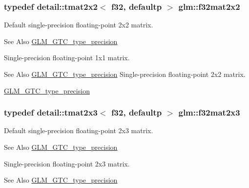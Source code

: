 \hypertarget{group__gtc__type__precision_ga4eb16d89ecff72fa77f10c9a1e7ca475}{
\subsubsection[{f32mat2x2}]{\setlength{\rightskip}{0pt plus 5cm}typedef detail\-::tmat2x2$<$ f32, defaultp $>$ {\bf glm\-::f32mat2x2}}}\label{group__gtc__type__precision_ga4eb16d89ecff72fa77f10c9a1e7ca475}
Default single-\/precision floating-\/point 2x2 matrix. \begin{DoxySeeAlso}{See Also}
\hyperlink{group__gtc__type__precision}{G\-L\-M\-\_\-\-G\-T\-C\-\_\-type\-\_\-precision}
\end{DoxySeeAlso}
Single-\/precision floating-\/point 1x1 matrix. \begin{DoxySeeAlso}{See Also}
\hyperlink{group__gtc__type__precision}{G\-L\-M\-\_\-\-G\-T\-C\-\_\-type\-\_\-precision} Single-\/precision floating-\/point 2x2 matrix. 

\hyperlink{group__gtc__type__precision}{G\-L\-M\-\_\-\-G\-T\-C\-\_\-type\-\_\-precision} 
\end{DoxySeeAlso}
\hypertarget{group__gtc__type__precision_ga5ad96c3a7d4c81520d1f30bf5dcdc2b6}{
\subsubsection[{f32mat2x3}]{\setlength{\rightskip}{0pt plus 5cm}typedef detail\-::tmat2x3$<$ f32, defaultp $>$ {\bf glm\-::f32mat2x3}}}\label{group__gtc__type__precision_ga5ad96c3a7d4c81520d1f30bf5dcdc2b6}
Default single-\/precision floating-\/point 2x3 matrix. \begin{DoxySeeAlso}{See Also}
\hyperlink{group__gtc__type__precision}{G\-L\-M\-\_\-\-G\-T\-C\-\_\-type\-\_\-precision}
\end{DoxySeeAlso}
Single-\/precision floating-\/point 2x3 matrix. \begin{DoxySeeAlso}{See Also}
\hyperlink{group__gtc__type__precision}{G\-L\-M\-\_\-\-G\-T\-C\-\_\-type\-\_\-precision} 
\end{DoxySeeAlso}
